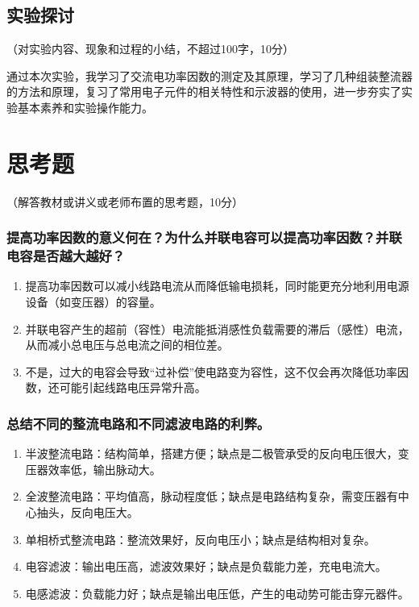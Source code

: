 \documentclass[10pt,a4paper]{ctexart}
\newcommand{\myspace}[1]{\par\vspace{#1\baselineskip}} %
\newcommand{\xiaosi}{\fontsize{12pt}{16pt}\selectfont}
\begin{document}
    \subsection{实验探讨}
    \xiaosi （对实验内容、现象和过程的小结，不超过100字，10分）

    \myspace{1}
    通过本次实验，我学习了交流电功率因数的测定及其原理，学习了几种组装整流器的方法和原理，复习了常用电子元件的相关特性和示波器的使用，进一步夯实了实验基本素养和实验操作能力。

\section{思考题}

    \xiaosi （解答教材或讲义或老师布置的思考题，10分）

    \subsubsection*{提高功率因数的意义何在？为什么并联电容可以提高功率因数？并联电容是否越大越好？}

    \begin{enumerate}
        \item 提高功率因数可以减小线路电流从而降低输电损耗，同时能更充分地利用电源设备（如变压器）的容量。
        \item 并联电容产生的超前（容性）电流能抵消感性负载需要的滞后（感性）电流，从而减小总电压与总电流之间的相位差。
        \item 不是，过大的电容会导致“过补偿”使电路变为容性，这不仅会再次降低功率因数，还可能引起线路电压异常升高。

    \end{enumerate}

    \subsubsection*{总结不同的整流电路和不同滤波电路的利弊。}
    
    \begin{enumerate}
        \item 半波整流电路：结构简单，搭建方便；缺点是二极管承受的反向电压很大，变压器效率低，输出脉动大。
        \item 全波整流电路：平均值高，脉动程度低；缺点是电路结构复杂，需变压器有中心抽头，反向电压大。
        \item 单相桥式整流电路：整流效果好，反向电压小；缺点是结构相对复杂。
        \item 电容滤波：输出电压高，滤波效果好；缺点是负载能力差，充电电流大。
        \item 电感滤波：负载能力好；缺点是输出电压低，产生的电动势可能击穿元器件。
    \end{enumerate}
\end{document}

